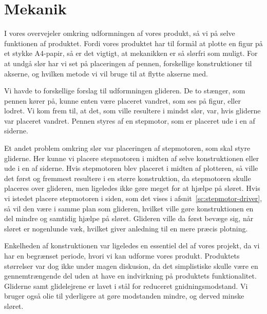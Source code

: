 \chapter[Design af mekanik]{Mekanik}


I vores overvejeler omkring udformningen af vores produkt, så vi på
selve funktionen af produktet. Fordi vores produktet har til formål at
plotte en figur på et stykke A4-papir, så er det vigtigt, at
mekanikken er så slørfri som muligt. For at undgå slør har vi set på
placeringen af pennen, forskellige konstruktioner til akserne, og
hvilken metode vi vil bruge til at flytte akserne med.

Vi havde to forskellige forslag til udformningen glideren. De to
stænger, som pennen kører på, kunne enten være placeret vandret, som
ses på figur, eller lodret. Vi kom frem
til, at det, som ville resultere i mindst slør, var, hvis gliderne var
placeret vandret. Pennen styres af en stepmotor, som er placeret ude i
en af siderne.

Et andet problem omkring slør var placeringen af stepmotoren, som skal
styre gliderne. Her kunne vi placere stepmotoren i midten af selve
konstruktionen eller ude i en af siderne. Hvis
stepmotoren blev placeret i midten af plotteren, så ville det først og
fremmest resultere i en større konstruktion, da stepmotoren skulle
placeres over glideren, men ligeledes ikke gøre meget for at hjælpe på
sløret. Hvis vi istedet placere stepmotoren i siden, som det vises i
afsnit~\vref{sc:stepmotor-driver}, så vil den være i
samme plan som glideren, hvilket ville gøre konstruktionen en del
mindre og samtidig hjælpe på sløret. Glideren ville da først bevæge sig,
når sløret er nogenlunde væk, hvilket giver anledning til en mere
præcis plotning.

Enkelheden af konstruktionen var ligeledes en essentiel del af vores
projekt, da vi har en begrænset periode, hvori vi kan udforme vores
produkt. Produktets størrelser var dog ikke under magen diskusion, da
det simplistiske skulle være en gennemtrængende del uden at have en
indvirkning på produktets funktionalitet. Gliderne samt glidelejrene er
lavet i stål for reduceret gnidningsmodstand. Vi bruger også olie til
yderligere at gøre modstanden mindre, og derved minske sløret.

 

